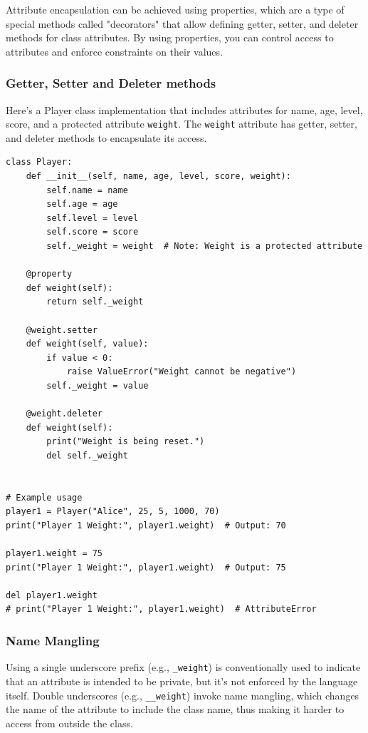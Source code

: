 Attribute encapsulation can be achieved using properties, which are a type of special methods called "decorators" that allow defining getter, setter, and deleter methods for class attributes. By using properties, you can control access to attributes and enforce constraints on their values.

\subsubsection{Getter, Setter and Deleter methods}
Here's a Player class implementation that includes attributes for name, age, level, score, and a protected attribute \texttt{weight}. The  \texttt{weight} attribute has getter, setter, and deleter methods to encapsulate its access.

\begin{codebox}
\begin{verbatim}
class Player:
    def __init__(self, name, age, level, score, weight):
        self.name = name
        self.age = age
        self.level = level
        self.score = score
        self._weight = weight  # Note: Weight is a protected attribute

    @property
    def weight(self):
        return self._weight

    @weight.setter
    def weight(self, value):
        if value < 0:
            raise ValueError("Weight cannot be negative")
        self._weight = value

    @weight.deleter
    def weight(self):
        print("Weight is being reset.")
        del self._weight


# Example usage
player1 = Player("Alice", 25, 5, 1000, 70)
print("Player 1 Weight:", player1.weight)  # Output: 70

player1.weight = 75
print("Player 1 Weight:", player1.weight)  # Output: 75

del player1.weight
# print("Player 1 Weight:", player1.weight)  # AttributeError
\end{verbatim}
\end{codebox}

\subsubsection{Name Mangling}
Using a single underscore prefix (e.g., \texttt{\_weight}) is conventionally used to indicate that an attribute is intended to be private, but it's not enforced by the language itself. Double underscores (e.g., \texttt{\_\_weight}) invoke name mangling, which changes the name of the attribute to include the class name, thus making it harder to access from outside the class. 


